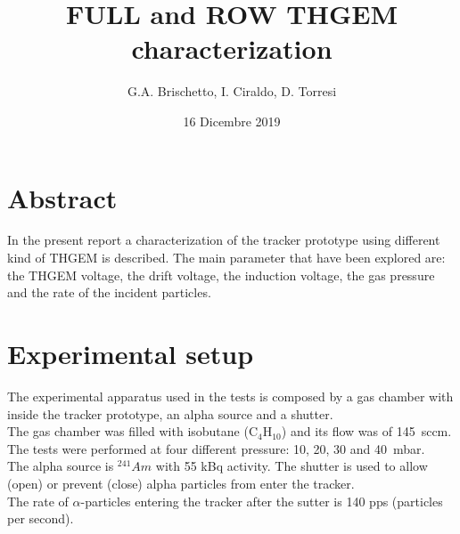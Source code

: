 \documentclass[a4paper, 11 pt]{article}
\title{\bf {\huge FULL and ROW THGEM characterization} }
\author{G.A. Brischetto, I. Ciraldo, D. Torresi}
\date{16 Dicembre 2019}
\begin{document}
\maketitle

\section*{Abstract}

In the present report a characterization of the tracker prototype using different kind of THGEM is 
described. The main parameter that have been explored are: the THGEM voltage, the drift voltage,
the induction voltage, the gas pressure and the rate of the incident particles.

\section{Experimental setup}

The experimental apparatus used in the tests is composed by a gas chamber with inside the tracker 
prototype, an alpha source and a shutter.\\
The gas chamber was filled with isobutane ($\mbox{C}_4\mbox{H}_{10}$) and its flow was of 145~sccm. 
The tests were performed at four different pressure: 10, 20, 30 and 40~mbar.\\
The alpha source is $^{241}Am$ with 55 kBq activity. The shutter is used to allow (open) or prevent 
(close) alpha particles from enter the tracker.\\
The rate of $\alpha$-particles entering the tracker after the sutter is 140 pps (particles per second).
\end{document}
